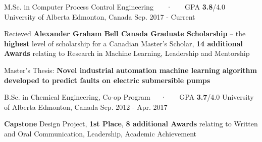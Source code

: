 

\begin{cventries}

  \cventry
    {M.Sc. in Computer Process Control Engineering ~~~·~~~ GPA \textbf{3.8}/4.0} %
    {University of Alberta} %
    {Edmonton, Canada} %
    {Sep. 2017 - Current} %
    {
      \begin{cvitems} %
        \item {Recieved \textbf{Alexander Graham Bell Canada Graduate Scholarship} – the \textbf{highest} level of scholarship for a Canadian Master's Scholar, \textbf{14 additional Awards} relating to Research in Machine Learning, Leadership and Mentorship }
        \item {Master's Thesis: \textbf{Novel industrial automation machine learning algorithm developed to predict faults on electric submersible pumps}}
      \end{cvitems}
    }

\cventry
{B.Sc. in Chemical Engineering, Co-op Program~~~·~~~ GPA \textbf{3.7}/4.0} %
{University of Alberta} %
{Edmonton, Canada} %
{Sep. 2012 - Apr. 2017} %
{
	\begin{cvitems} %
		\item {\textbf{Capstone} Design Project, \textbf{1st Place}, \textbf{8 additional Awards} relating to Written and Oral Communication, Leadership, Academic Achievement}
	\end{cvitems}
}

\end{cventries}
